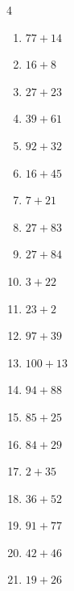 \begin{multicols}{4}
\begin{enumerate}
  \item $77+14$
        \phantom{$=91$}

  \item $16+8$
        \phantom{$=24$}

  \item $27+23$
        \phantom{$=50$}

  \item $39+61$
        \phantom{$=100$}

  \item $92+32$
        \phantom{$=124$}

  \item $16+45$
        \phantom{$=61$}

  \item $7+21$
        \phantom{$=28$}

  \item $27+83$
        \phantom{$=110$}

  \item $27+84$
        \phantom{$=111$}

  \item $3+22$
        \phantom{$=25$}

  \item $23+2$
        \phantom{$=25$}

  \item $97+39$
        \phantom{$=136$}

  \item $100+13$
        \phantom{$=113$}

  \item $94+88$
        \phantom{$=182$}

  \item $85+25$
        \phantom{$=110$}

  \item $84+29$
        \phantom{$=113$}

  \item $2+35$
        \phantom{$=37$}

\columnbreak %

  \item $36+52$
        \phantom{$=88$}

  \item $91+77$
        \phantom{$=168$}

  \item $42+46$
        \phantom{$=88$}

  \item $19+26$
        \phantom{$=45$}


\end{enumerate}
\end{multicols}
